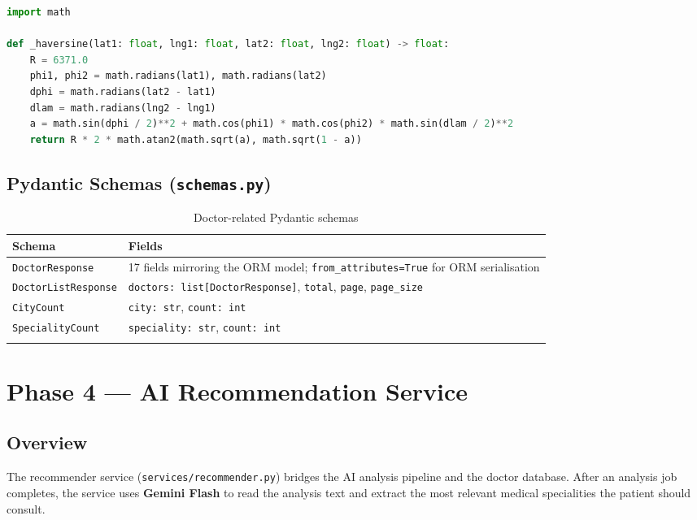 \documentclass[12pt, a4paper]{article}
\newcommand{\file}[1]{\texttt{\color{accent}#1}}
\begin{document}
\begin{lstlisting}[caption={Haversine distance calculation}, language=Python]
import math

def _haversine(lat1: float, lng1: float, lat2: float, lng2: float) -> float:
    R = 6371.0
    phi1, phi2 = math.radians(lat1), math.radians(lat2)
    dphi = math.radians(lat2 - lat1)
    dlam = math.radians(lng2 - lng1)
    a = math.sin(dphi / 2)**2 + math.cos(phi1) * math.cos(phi2) * math.sin(dlam / 2)**2
    return R * 2 * math.atan2(math.sqrt(a), math.sqrt(1 - a))
\end{lstlisting}

\subsection{Pydantic Schemas (\file{schemas.py})}

\begin{longtable}{p{4cm} p{9.5cm}}
  \toprule
  \textbf{Schema} & \textbf{Fields} \\
  \midrule
  \texttt{DoctorResponse}      & 17 fields mirroring the ORM model; \texttt{from\_attributes=True} for ORM serialisation \\[4pt]
  \texttt{DoctorListResponse}  & \texttt{doctors: list[DoctorResponse]}, \texttt{total}, \texttt{page}, \texttt{page\_size} \\[4pt]
  \texttt{CityCount}           & \texttt{city: str}, \texttt{count: int} \\[4pt]
  \texttt{SpecialityCount}     & \texttt{speciality: str}, \texttt{count: int} \\
  \bottomrule
  \caption{Doctor-related Pydantic schemas}
\end{longtable}

\section{Phase 4 — AI Recommendation Service}

\subsection{Overview}

The recommender service (\file{services/recommender.py}) bridges the
AI analysis pipeline and the doctor database. After an analysis job
completes, the service uses \textbf{Gemini Flash} to read the analysis
text and extract the most relevant medical specialities the patient
should consult.
\end{document}
